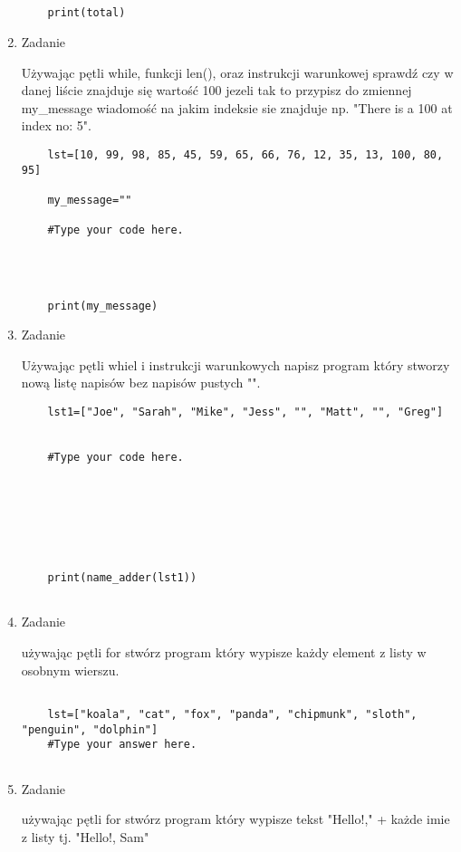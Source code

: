 \documentclass[11pt]{article}
\begin{document}
\begin{enumerate}
\begin{lstlisting}
	
	
	print(total)
\end{lstlisting}

\item\begin{Large}
	Zadanie
\end{Large}
\par
Używając pętli while, funkcji len(), oraz instrukcji warunkowej sprawdź czy w danej liście znajduje się wartość 100 jezeli tak to przypisz do zmiennej my\_message wiadomość na jakim indeksie sie znajduje np. "There is a 100 at index no: 5".
\begin{lstlisting}
	lst=[10, 99, 98, 85, 45, 59, 65, 66, 76, 12, 35, 13, 100, 80, 95]
	
	my_message=""
	
	#Type your code here.
	
	
	
	
	print(my_message)
\end{lstlisting}

\item 
\begin{Large}
	Zadanie
\end{Large}
\par
Używając pętli whiel i instrukcji warunkowych napisz program który stworzy nową listę napisów bez napisów pustych "".
\begin{lstlisting}
	lst1=["Joe", "Sarah", "Mike", "Jess", "", "Matt", "", "Greg"]
	
	
	#Type your code here.
	
	
	
	
	
	
	
	print(name_adder(lst1))
	
\end{lstlisting}

\item 
\begin{Large}
	Zadanie
\end{Large}
\par
używając pętli for stwórz program który wypisze każdy element z listy w osobnym wierszu.

\begin{lstlisting}
	
	lst=["koala", "cat", "fox", "panda", "chipmunk", "sloth", "penguin", "dolphin"]
	#Type your answer here.
	
\end{lstlisting}

\item 
\begin{Large}
	Zadanie
\end{Large}
\par
używając pętli for stwórz program który wypisze tekst "Hello!,"  + każde imie z listy tj. "Hello!, Sam"


\end{enumerate}
\end{document}
